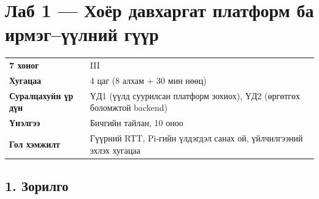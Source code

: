 \chapter{Лаб 1 — Хоёр давхаргат платформ ба ирмэг–үүлний гүүр}

\begingroup\scriptsize\begin{longtable}[]{@{}ll@{}}
\toprule
\endhead
\begin{minipage}[t]{0.47\columnwidth}\raggedright
\textbf{7 хоног}\strut
\end{minipage} & \begin{minipage}[t]{0.47\columnwidth}\raggedright
III\strut
\end{minipage}\tabularnewline
\begin{minipage}[t]{0.47\columnwidth}\raggedright
\textbf{Хугацаа}\strut
\end{minipage} & \begin{minipage}[t]{0.47\columnwidth}\raggedright
4 цаг (8 алхам + 30 мин нөөц)\strut
\end{minipage}\tabularnewline
\begin{minipage}[t]{0.47\columnwidth}\raggedright
\textbf{Суралцахуйн үр дүн}\strut
\end{minipage} & \begin{minipage}[t]{0.47\columnwidth}\raggedright
ҮД1 (үүлд суурилсан платформ зохиох), ҮД2 (өргөтгөх боломжтой backend)\strut
\end{minipage}\tabularnewline
\begin{minipage}[t]{0.47\columnwidth}\raggedright
\textbf{Үнэлгээ}\strut
\end{minipage} & \begin{minipage}[t]{0.47\columnwidth}\raggedright
Бичгийн тайлан, 10 оноо\strut
\end{minipage}\tabularnewline
\begin{minipage}[t]{0.47\columnwidth}\raggedright
\textbf{Гол хэмжилт}\strut
\end{minipage} & \begin{minipage}[t]{0.47\columnwidth}\raggedright
Гүүрний RTT, Pi-гийн үлдэгдэл санах ой, үйлчилгээний эхлэх хугацаа\strut
\end{minipage}\tabularnewline
\bottomrule
\end{longtable}\endgroup

\hypertarget{ux437ux43eux440ux438ux43bux433ux43e}{%
\section{1. Зорилго}\label{ux437ux43eux440ux438ux43bux433ux43e}}

